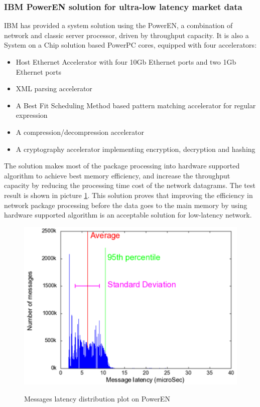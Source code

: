 \documentclass[11pt,openright,a4paper]{report}
\begin{document}
\subsubsection{IBM PowerEN solution for ultra-low latency market data}
IBM has provided a system solution using the PowerEN, a combination of network and classic server processor, driven by throughput capacity\cite{pasetto2011ultra}. It is also a System on a Chip solution based PowerPC cores, equipped with four accelerators:
\begin{itemize}
	\item Host Ethernet Accelerator with four 10Gb Ethernet ports and two 1Gb Ethernet ports
	\item XML parsing accelerator
	\item A Best Fit Scheduling Method based pattern matching accelerator for regular expression
	\item A compression/decompression accelerator
	\item A cryptography accelerator implementing encryption, decryption and hashing
\end{itemize}
The solution makes most of the package processing into hardware supported algorithm to achieve best memory efficiency, and increase the throughput capacity by reducing the processing time cost of the network datagrams. The test result is shown in picture \ref{fig:ibmpoweren}. This solution proves that improving the efficiency in network package processing before the data goes to the main memory by using hardware supported algorithm is an acceptable solution for low-latency network.\\ 
\begin{figure}
\centering
\includegraphics[width=0.5\linewidth]{picture/ibmpoweren}
\caption{Messages latency distribution plot on PowerEN}\cite{pasetto2011ultra}
\label{fig:ibmpoweren}
\end{figure}
\end{document}
